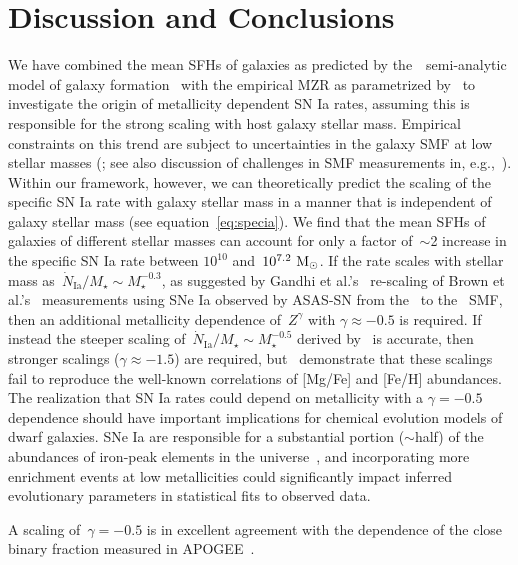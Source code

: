 \documentclass[ms.tex]{subfiles}
\begin{document}
\section{Discussion and Conclusions}
\label{sec:conclusions}

We have combined the mean SFHs of galaxies as predicted by the~\um~semi-analytic
model of galaxy formation~\citep{Behroozi2019} with the empirical MZR as
parametrized by~\citet{Zahid2014} to investigate the origin of metallicity
dependent SN Ia rates, assuming this is responsible for the strong scaling with
host galaxy stellar mass.
Empirical constraints on this trend are subject to uncertainties in the
galaxy SMF at low stellar masses (\citealp{Gandhi2022}; see also discussion of
challenges in SMF measurements in, e.g.,~\citealp{Weigel2016}).
Within our framework, however, we can theoretically predict the scaling of the
specific SN Ia rate with galaxy stellar mass in a manner that is independent of
galaxy stellar mass (see equation~\ref{eq:specia}).
We find that the mean SFHs of galaxies of different stellar masses can account
for only a factor of~$\sim$2 increase in the specific SN Ia rate between
$10^{10}$ and~$10^{7.2}~\text{M}_\odot$.
If the rate scales with stellar mass as~$\dot{N}_\text{Ia} / M_\star \sim
M_\star^{-0.3}$, as suggested by Gandhi et al.'s~\citeyearpar{Gandhi2022}
re-scaling of Brown et al.'s~\citeyearpar{Brown2019} measurements using SNe Ia
observed by ASAS-SN from the~\citet{Bell2003} to the~\citet{Baldry2012} SMF,
then an additional metallicity dependence of~$Z^\gamma$ with
$\gamma \approx -0.5$ is required.
If instead the steeper scaling of~$\dot{N}_\text{Ia} / M_\star \sim
M_\star^{-0.5}$ derived by~\citet{Brown2019} is accurate, then stronger
scalings ($\gamma \approx -1.5$) are required, but~\citet{Gandhi2022}
demonstrate that these scalings fail to reproduce the well-known correlations
of [Mg/Fe] and [Fe/H] abundances.
The realization that SN Ia rates could depend on metallicity with a
$\gamma = -0.5$ dependence should have important implications for chemical
evolution models of dwarf galaxies.
SNe Ia are responsible for a substantial portion ($\sim$half) of the abundances
of iron-peak elements in the universe~\citep[e.g.][]{Johnson2019}, and
incorporating more enrichment events at low metallicities could significantly
impact inferred evolutionary parameters in statistical fits to observed data.
\par
A scaling of~$\gamma = -0.5$ is in excellent agreement with the dependence of
the close binary fraction measured in APOGEE~\citep{Moe2019}.
\end{document}
